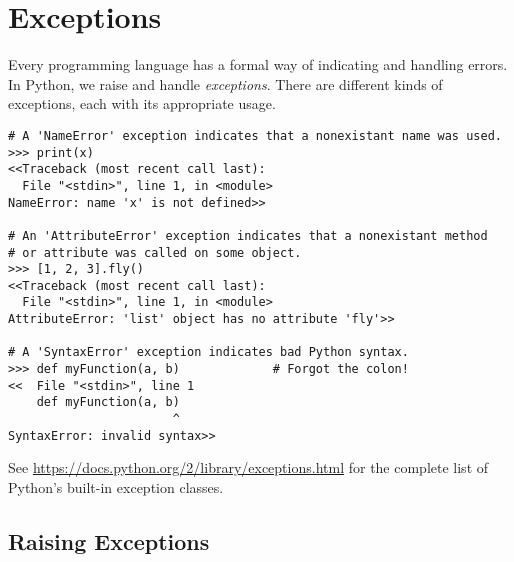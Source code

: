 \label{lab:Exceptions}


\section*{Exceptions} %

Every programming language has a formal way of indicating and handling errors.
In Python, we raise and handle \emph{exceptions}.
There are different kinds of exceptions, each with its appropriate usage.

\begin{lstlisting}
# A 'NameError' exception indicates that a nonexistant name was used.
>>> print(x)
<<Traceback (most recent call last):
  File "<stdin>", line 1, in <module>
NameError: name 'x' is not defined>>

# An 'AttributeError' exception indicates that a nonexistant method
# or attribute was called on some object.
>>> [1, 2, 3].fly()
<<Traceback (most recent call last):
  File "<stdin>", line 1, in <module>
AttributeError: 'list' object has no attribute 'fly'>>

# A 'SyntaxError' exception indicates bad Python syntax.
>>> def myFunction(a, b)             # Forgot the colon!
<<  File "<stdin>", line 1
    def myFunction(a, b)
                       ^
SyntaxError: invalid syntax>>
\end{lstlisting}

See \url{https://docs.python.org/2/library/exceptions.html} for the complete list of Python's built-in exception classes.

\subsection*{Raising Exceptions} %

